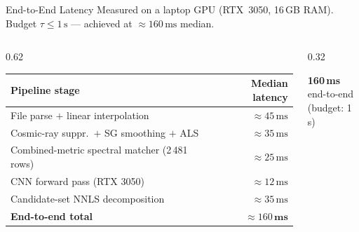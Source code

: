 \documentclass[aspectratio=169,10pt]{beamer}
\begin{document}
\begin{frame}{End-to-End Latency}
  Measured on a laptop GPU (RTX~3050, 16\,GB RAM).
  Budget $\tau\le1\,\text{s}$ --- achieved at $\approx160\,\text{ms}$ median.

  \vspace{0.22cm}
  \begin{columns}[c]
    \begin{column}{0.62\textwidth}
      \footnotesize
      \begin{tabular}{@{}lr@{}}
        \toprule
        \textbf{Pipeline stage} & \textbf{Median latency}\\
        \midrule
        File parse $+$ linear interpolation
          & $\approx45\,\text{ms}$\\
        Cosmic-ray suppr.\ $+$ SG smoothing $+$ ALS
          & $\approx35\,\text{ms}$\\
        Combined-metric spectral matcher (2\,481 rows)
          & $\approx25\,\text{ms}$\\
        CNN forward pass (RTX 3050)
          & $\approx12\,\text{ms}$\\
        Candidate-set NNLS decomposition
          & $\approx35\,\text{ms}$\\
        \midrule
        \textbf{End-to-end total}
          & $\bm{\approx}160\,\mathbf{ms}$\\
        \bottomrule
      \end{tabular}
    \end{column}
    \begin{column}{0.32\textwidth}
      \begin{tcolorbox}[mathbox]
        \centering
        {\huge\bfseries\color{headerbg}160\,ms}\\[3pt]
        {\footnotesize end-to-end}\\[1pt]
        {\footnotesize (budget: 1\,s)}
      \end{tcolorbox}
    \end{column}
  \end{columns}
\end{frame}
\end{document}
